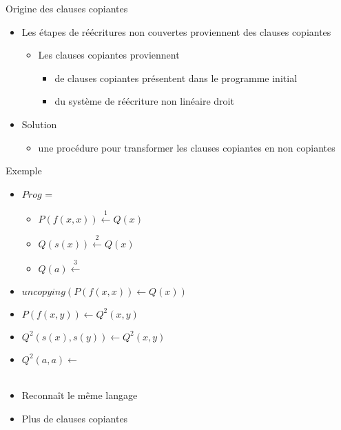 \begin{frame}{Origine des clauses copiantes}
  \begin{itemize}[<+->]
  \item Les étapes de réécritures non couvertes proviennent des clauses copiantes
    \begin{itemize}
    \item Les clauses copiantes proviennent
      \begin{itemize}
      \item de clauses copiantes présentent dans le programme initial
      \item du système de réécriture non linéaire droit
      \end{itemize}
    \end{itemize}
    \vspace{\baselineskip}
  \item Solution
    \begin{itemize}
    \item une procédure pour transformer les clauses copiantes en non copiantes
    \end{itemize}
  \end{itemize}
\end{frame}

\begin{frame}{Exemple}
  \begin{itemize}[<+->]
  \item $Prog$ =
    \begin{itemize}
    \item $P(f(x,x)) \stackrel{1}{\leftarrow} Q(x)$
    \item {}$Q(s(x)) \stackrel{2}{\leftarrow} Q(x)$
    \item {}$Q(a) \stackrel{3}{\leftarrow} $
    \end{itemize}
    \vspace{\baselineskip}

  \item $uncopying(P(f(x,x)) \leftarrow Q(x))$
  \item $P(f(x,y)) \leftarrow Q^2(x, y)$
  \item $Q^2(s(x),s(y)) \leftarrow Q^2(x,y)$
  \item $Q^2(a,a) \leftarrow $ \\~

  \item Reconnaît le même langage
  \item Plus de clauses copiantes
  \end{itemize}
    
\end{frame}

